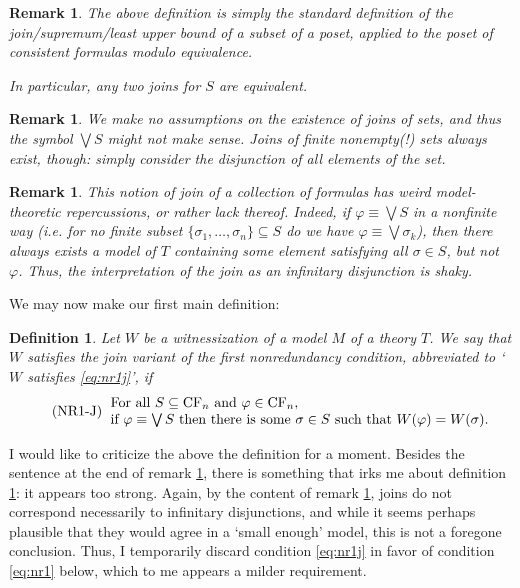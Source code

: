 \documentclass{article}
\newtheorem{remark}[theorem]{Remark}
\newtheorem{definition}[theorem]{Definition}
\theoremstyle{nonumberplain}
\newcommand{\CF}{\mathrm{CF}}
\begin{document}
\begin{remark}
The above definition is simply the standard definition of the join\slash supremum\slash least upper bound of a subset of a poset, applied to the poset of consistent formulas modulo equivalence.

In particular, any two joins for $S$ are equivalent.
\end{remark}

\begin{remark}
We make no assumptions on the existence of joins of sets, and thus the symbol $\bigvee S$ might not make sense. Joins of finite nonempty(!) sets always exist, though: simply consider the disjunction of all elements of the set.
\end{remark}

\begin{remark}\label{rmk:shaky}
This notion of join of a collection of formulas has weird model-theoretic repercussions, or rather lack thereof. Indeed, if $\varphi \equiv \bigvee S$ in a nonfinite way (i.e. for no finite subset $\{\sigma_1, \dots, \sigma_n\}\subseteq S$ do we have $\varphi \equiv \bigvee \sigma_k$), then there always exists a model of $T$ containing some element satisfying all $\sigma \in S$, but not $\varphi$. Thus, the interpretation of the join as an infinitary disjunction is shaky.
\end{remark}

We may now make our first main definition:
\begin{definition}\label{def:nr1j}
Let $W$ be a witnessization of a model $M$ of a theory $T$. We say that $W$ satisfies the \emph{join variant of the first nonredundancy condition}, abbreviated to `$W$ satisfies \eqref{eq:nr1j}', if
\begin{equation}
\tag{NR1-J}\label{eq:nr1j}
\begin{tabular}{l}
For all $S \subseteq \CF_n$ and $\varphi \in \CF_n$,\\
if $\varphi \equiv \bigvee S$ then there is some $\sigma \in S$ such that $W(\varphi) = W(\sigma)$.
\end{tabular}
\end{equation}
\end{definition}

I would like to criticize the above the definition for a moment. Besides the sentence at the end of remark \ref{rmk:shaky}, there is something that irks me about definition \ref{def:nr1j}: it appears too strong. Again, by the content of remark \ref{rmk:shaky}, joins do not correspond necessarily to infinitary disjunctions, and while it seems perhaps plausible that they would agree in a `small enough' model, this is not a foregone conclusion. Thus, I temporarily discard condition \eqref{eq:nr1j} in favor of condition \eqref{eq:nr1} below, which to me appears a milder requirement.
\end{document}
